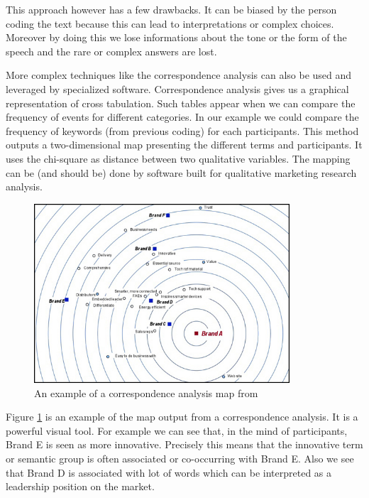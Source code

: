 \documentclass[10pt]{report}
\begin{document}
This approach however has a few drawbacks. It can be biased by the person coding the text because this can lead to interpretations or complex choices. Moreover by doing this we lose informations about the tone or the form of the speech and the rare or complex answers are lost. 

More complex techniques like the correspondence analysis can also be used and leveraged by specialized software. Correspondence analysis gives us a graphical representation of cross tabulation. Such tables appear when we can compare the frequency of events for different categories. In our example we could compare the frequency of keywords (from previous coding) for each participants. \autocite{yelland2010correspondence} This method outputs a two-dimensional map presenting the different terms and participants. It uses the chi-square as distance between two qualitative variables. The mapping can be (and should be) done by software built for qualitative marketing research analysis.

\begin{figure}[h!]
\centering
\includegraphics[width=0.85\textwidth]{AFCex.jpg}
\caption{An example of a correspondence analysis map from \autocite{AFCwebsite}}
\label{AFCexample}
\end{figure}

Figure \ref{AFCexample} is an example of the map output from a correspondence analysis. It is a powerful visual tool. For example we can see that, in the mind of participants, Brand E is seen as more innovative. Precisely this means that the innovative term or semantic group is often associated or co-occurring with Brand E. Also we see that Brand D is associated with lot of words which can be interpreted as a leadership position on the market.
\end{document}
